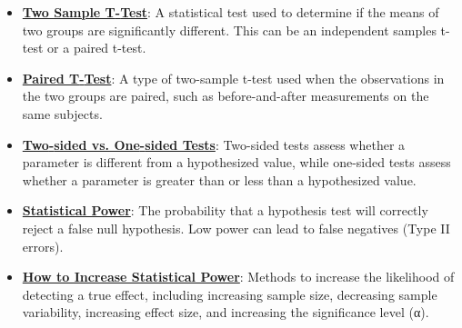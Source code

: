\documentclass{article}%
\begin{document}
\begin{itemize}[leftmargin=*]
\item \href{https://purdue.brightspace.com/d2l/common/assets/pdfjs-d2l-dist/1.0.14-legacy/web/viewer.html?file=\%2Fcontent\%2Fenforced\%2F1095465-WL.202510.CS24200.LE1\%2F13L2-hypothesis.pdf\%3Fou\%3D1095465\&lang=en-us\&container=d2l-fileviewer-rendered-pdf\&fullscreen=d2l-fileviewer-rendered-pdf-dialog\&height=667#page=25}{\textbf{Two Sample T{-}Test}}: A statistical test used to determine if the means of two groups are significantly different. This can be an independent samples t-test or a paired t-test.%
\item \href{https://purdue.brightspace.com/d2l/common/assets/pdfjs-d2l-dist/1.0.14-legacy/web/viewer.html?file=\%2Fcontent\%2Fenforced\%2F1095465-WL.202510.CS24200.LE1\%2F13L2-hypothesis.pdf\%3Fou\%3D1095465\&lang=en-us\&container=d2l-fileviewer-rendered-pdf\&fullscreen=d2l-fileviewer-rendered-pdf-dialog\&height=667#page=34}{\textbf{Paired T{-}Test}}: A type of two-sample t-test used when the observations in the two groups are paired, such as before-and-after measurements on the same subjects.%
\item \href{https://purdue.brightspace.com/d2l/common/assets/pdfjs-d2l-dist/1.0.14-legacy/web/viewer.html?file=\%2Fcontent\%2Fenforced\%2F1095465-WL.202510.CS24200.LE1\%2F13L2-hypothesis.pdf\%3Fou\%3D1095465\&lang=en-us\&container=d2l-fileviewer-rendered-pdf\&fullscreen=d2l-fileviewer-rendered-pdf-dialog\&height=667#page=29}{\textbf{Two{-}sided vs. One{-}sided Tests}}: Two-sided tests assess whether a parameter is different from a hypothesized value, while one-sided tests assess whether a parameter is greater than or less than a hypothesized value.%
\item \href{https://purdue.brightspace.com/d2l/common/assets/pdfjs-d2l-dist/1.0.14-legacy/web/viewer.html?file=\%2Fcontent\%2Fenforced\%2F1095465-WL.202510.CS24200.LE1\%2F13L2-hypothesis.pdf\%3Fou\%3D1095465\&lang=en-us\&container=d2l-fileviewer-rendered-pdf\&fullscreen=d2l-fileviewer-rendered-pdf-dialog\&height=667#page=38}{\textbf{Statistical Power}}: The probability that a hypothesis test will correctly reject a false null hypothesis. Low power can lead to false negatives (Type II errors).%
\item \href{https://purdue.brightspace.com/d2l/common/assets/pdfjs-d2l-dist/1.0.14-legacy/web/viewer.html?file=\%2Fcontent\%2Fenforced\%2F1095465-WL.202510.CS24200.LE1\%2F13L2-hypothesis.pdf\%3Fou\%3D1095465\&lang=en-us\&container=d2l-fileviewer-rendered-pdf\&fullscreen=d2l-fileviewer-rendered-pdf-dialog\&height=667#page=39}{\textbf{How to Increase Statistical Power}}: Methods to increase the likelihood of detecting a true effect, including increasing sample size, decreasing sample variability, increasing effect size, and increasing the significance level (α).%
\end{itemize}%
\end{document}
